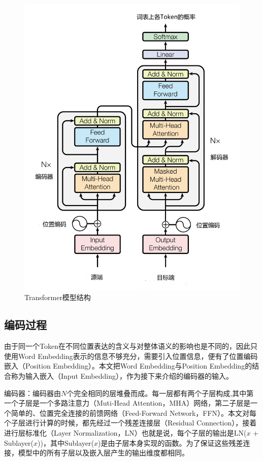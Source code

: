 \begin{figure}[h]
	\centering
	\includegraphics[width=0.8\linewidth]{figures/Transformer_Structure.png}
	\caption{Transformer模型结构\cite{Attn_is_all_you_need}}
	\label{Transformer_Structure}
\end{figure}

\subsection{编码过程}

由于同一个Token在不同位置表达的含义与对整体语义的影响也是不同的，因此只使用Word Embedding表示的信息不够充分，需要引入位置信息，便有了位置编码嵌入（Position Embedding）。本文把Word Embedding与Position Embedding的结合称为输入嵌入（Input Embedding），作为接下来介绍的编码器的输入。

编码器：编码器由$N$个完全相同的层堆叠而成。每一层都有两个子层构成,其中第一个子层是一个多路注意力（Muti-Head Attention，MHA）网络，第二子层是一个简单的、位置完全连接的前馈网络（Feed-Forward Network，FFN）。本文对每个子层进行计算的时候，都先经过一个残差连接层（Residual Connection），接着进行层标准化（Layer Normalization，LN）也就是说，每个子层的输出是LN($x$ + Sublayer($x$))，其中Sublayer($x$)是由子层本身实现的函数。为了保证这些残差连接，模型中的所有子层以及嵌入层产生的输出维度都相同。

